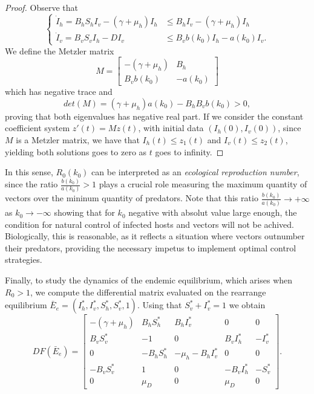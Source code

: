 \documentclass{amsart}
\theoremstyle{definition}
\theoremstyle{remark}
\numberwithin{equation}{section}
\begin{document}
\begin{proof}
Observe that
	$$
	\begin{cases}
			\dot{I}_h = B_h S_h I_v - (\gamma + \mu_h) I_h&\leq B_h I_v - (\gamma + \mu_h) I_h \\
			\dot{I}_v = B_v S_v I_h -  D I_v&\leq B_v b(k_0) I_h -a(k_0) I_v.
		\end{cases}
	$$
	We define the Metzler matrix
		\begin{equation}\label{matriz Metzler}
	M=
\begin{bmatrix}
-(\gamma + \mu_h) & B_h \\%
B_v b(k_0) & -a(k_0)
\end{bmatrix}
\end{equation}
which has negative trace and 
	$$det(M)= (\gamma + \mu_h)a(k_0) - B_h B_v  b(k_0) >0,
	$$
proving that both eigenvalues has negative real part. If we consider the constant coefficient system $z'(t)=Mz(t)$, with initial data $(I_h(0),I_v(0))$, since $M$ is a Metzler matrix, we have that $I_h(t)\le z_1(t)$ and $I_v(t)\le z_2(t)$, yielding 
both solutions goes to zero as $t$ goes to infinity.
\end{proof}

 In this sense, $R_0(k_0)$ can be interpreted as an \emph{ecological reproduction number}, since the ratio $\frac{b(k_0)}{a(k_0)}>1$ plays a crucial role measuring the maximum quantity of vectors over the mininum quantity of predators. Note that this ratio $\frac{b(k_0)}{a(k_0)}\to +\infty$ as $k_0\to -\infty$ showing that for $k_0$ negative with absolut value large enough, the condition for natural control of infected hosts and vectors will not be achived. Biologically, this is reasonable, as it reflects a situation where vectors outnumber their predators, providing the necessary impetus to implement optimal control strategies.

\smallskip
Finally, to study the dynamics of the endemic equilibrium, which arises when $R_0>1$, we compute 
the differential matrix evaluated on the rearrange equilibrium $\bar{E}_e=(I_h^*, I_v^*, S_h^*, S_v^*,1)$. Using that $S_v^*+I_v^*=1$ we obtain
$$
DF(\bar{E}_e) =
\begin{bmatrix}
	-(\gamma + \mu_h) & B_h S^*_h & B_h I^*_v  & 0 & 0 \\
	B_v S^*_v & -1 & 0 & B_v I^*_h & -I^*_v \\
	0 & -B_h S^*_h & -\mu_h-B_h I^*_v & 0 & 0 \\
	-B_v S^*_v & 1&0 & -B_vI^*_h&  - S^*_v \\
	0 &  \mu_D & 0 & \mu_D  & 0
\end{bmatrix}.
$$
\end{document}

